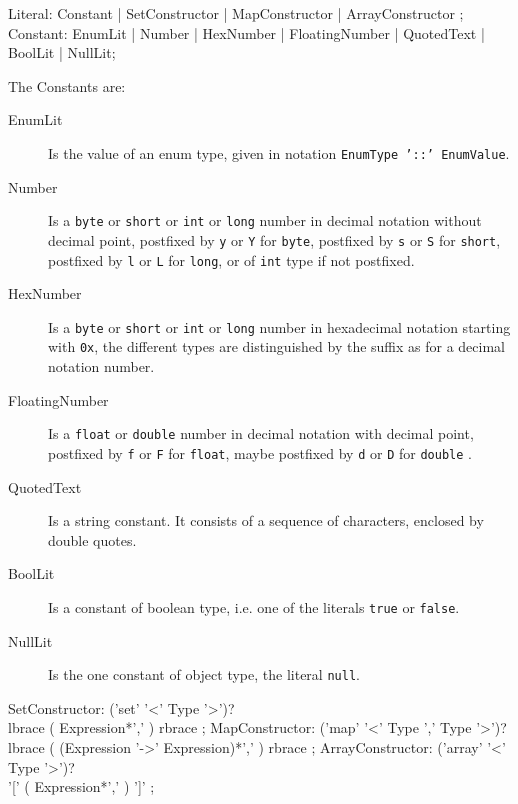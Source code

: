 \begin{rail}
  Literal: Constant | SetConstructor | MapConstructor | ArrayConstructor ;
  Constant: EnumLit | Number | HexNumber | FloatingNumber | QuotedText | BoolLit | NullLit;
\end{rail}

The Constants are:
\begin{description}
  \item[EnumLit] Is the value of an enum type, given in notation \texttt{EnumType '::' EnumValue}.
  \item[Number] Is a \texttt{byte} or \texttt{short} or \texttt{int} or \texttt{long} number in decimal notation without decimal point, postfixed by \texttt{y} or \texttt{Y} for \texttt{byte}, postfixed by \texttt{s} or \texttt{S} for \texttt{short}, postfixed by \texttt{l} or \texttt{L} for \texttt{long}, or of \texttt{int} type if not postfixed.
  \item[HexNumber] Is a \texttt{byte} or \texttt{short} or \texttt{int} or \texttt{long} number in hexadecimal notation starting with \texttt{0x}, the different types are distinguished by the suffix as for a decimal notation number.
  \item[FloatingNumber] Is a \texttt{float} or \texttt{double} number in decimal notation with decimal point, postfixed by \texttt{f} or \texttt{F} for \texttt{float}, maybe postfixed by \texttt{d} or \texttt{D} for \texttt{double} .
  \item[QuotedText] Is a string constant. It consists of a sequence of characters, enclosed by double quotes.
  \item[BoolLit] Is a constant of boolean type, i.e. one of the literals \texttt{true} or \texttt{false}.
  \item[NullLit] Is the one constant of object type, the literal \texttt{null}.
\end{description}

\begin{rail}
  SetConstructor: ('set' '<' Type '>')? \\ lbrace ( Expression*',' ) rbrace ;
  MapConstructor: ('map' '<' Type ',' Type '>')? \\ lbrace ( (Expression '->' Expression)*',' ) rbrace ;
  ArrayConstructor: ('array' '<' Type '>')? \\ '[' ( Expression*',' ) ']' ;
\end{rail}

